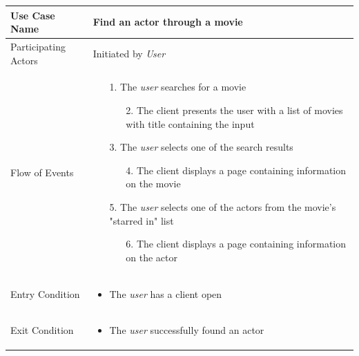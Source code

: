 \begin{center}
	\begin{tabular}{ | l | p{10cm} |  }
		 \hline
		Use Case Name & Find an actor through a movie \\ \hline
		Participating Actors & Initiated by \emph{User} \\ \hline
		Flow of Events & \begin{enumerate}
						\item[1.] The \emph{user} searches for a movie
						\begin{enumerate}
							\item[2.] The client presents the user with a list of movies with title containing the input
						\end{enumerate}
						\item[3.] The \emph{user} selects one of the search results
						\begin{enumerate}
							\item[4.] The client displays a page containing information on the movie
						\end{enumerate}
						\item[5.] The \emph{user} selects one of the actors from the movie's "starred in" list
						\begin{enumerate}
							\item[6.] The client displays a page containing information on the actor
						\end{enumerate}
					\end{enumerate} \\ \hline
		Entry Condition & \begin{itemize}
						\item The \emph{user} has a client open
					\end{itemize} \\ \hline
		Exit Condition & \begin{itemize}
						\item The \emph{user} successfully found an actor
					\end{itemize} \\
		\hline
	\end{tabular}
\end{center}


